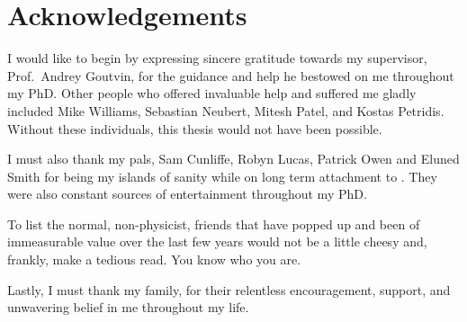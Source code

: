 \clearpage
\chapter*{\centering Acknowledgements}
\begin{center}
  {\setlength{\currentparskip}{\parskip}%
  \begin{minipage}{\abstractpagewidth}
    \setlength{\parskip}{\currentparskip}%
    I would like to begin by expressing sincere gratitude towards my supervisor, Prof.~Andrey
    Goutvin, for the guidance and help he bestowed on me throughout my PhD.
    Other people who offered invaluable help and suffered me gladly included
    Mike Williams, Sebastian Neubert, Mitesh Patel, and Kostas Petridis.
    Without these individuals, this thesis would not have been possible.

    I must also thank my pals, Sam Cunliffe, Robyn Lucas, Patrick Owen and Eluned Smith for being
    my islands of sanity while on long
    term attachment to \cern.
    They were also constant sources of entertainment throughout my PhD.

    To list the normal, non-physicist, friends that have popped up and been of immeasurable value
    over the last few years would not be a little cheesy and, frankly, make a tedious read.
    You know who you are.

    Lastly, I must thank my family, for their relentless encouragement, support, and
    unwavering belief in me throughout my life.

  \end{minipage}}
\end{center}



